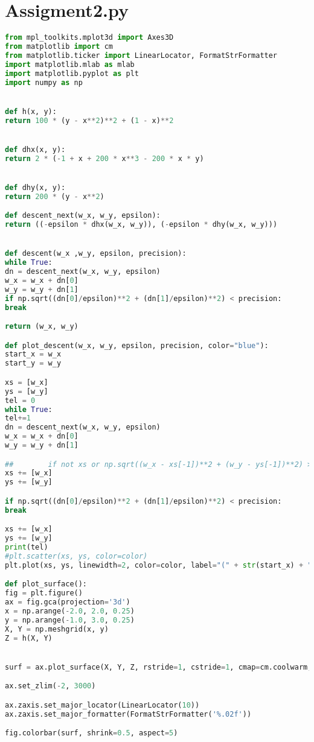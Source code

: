 \documentclass{article}
\begin{document}
\section{Assigment2.py}
\begin{lstlisting}[language=python]
from mpl_toolkits.mplot3d import Axes3D
from matplotlib import cm
from matplotlib.ticker import LinearLocator, FormatStrFormatter
import matplotlib.mlab as mlab
import matplotlib.pyplot as plt
import numpy as np


def h(x, y):
return 100 * (y - x**2)**2 + (1 - x)**2


def dhx(x, y):
return 2 * (-1 + x + 200 * x**3 - 200 * x * y)


def dhy(x, y):
return 200 * (y - x**2)

def descent_next(w_x, w_y, epsilon):
return ((-epsilon * dhx(w_x, w_y)), (-epsilon * dhy(w_x, w_y)))


def descent(w_x ,w_y, epsilon, precision):
while True:
dn = descent_next(w_x, w_y, epsilon)
w_x = w_x + dn[0]
w_y = w_y + dn[1]
if np.sqrt((dn[0]/epsilon)**2 + (dn[1]/epsilon)**2) < precision:
break    

return (w_x, w_y)

def plot_descent(w_x, w_y, epsilon, precision, color="blue"):
start_x = w_x
start_y = w_y

xs = [w_x]
ys = [w_y]
tel = 0
while True:
tel+=1
dn = descent_next(w_x, w_y, epsilon)
w_x = w_x + dn[0]
w_y = w_y + dn[1]

##        if not xs or np.sqrt((w_x - xs[-1])**2 + (w_y - ys[-1])**2) > 0.05:
xs += [w_x]
ys += [w_y]        

if np.sqrt((dn[0]/epsilon)**2 + (dn[1]/epsilon)**2) < precision:
break

xs += [w_x]
ys += [w_y]
print(tel)
#plt.scatter(xs, ys, color=color)
plt.plot(xs, ys, linewidth=2, color=color, label="(" + str(start_x) + "," + str(start_y) + ")")

def plot_surface():
fig = plt.figure()
ax = fig.gca(projection='3d')
x = np.arange(-2.0, 2.0, 0.25)
y = np.arange(-1.0, 3.0, 0.25)
X, Y = np.meshgrid(x, y)
Z = h(X, Y)


surf = ax.plot_surface(X, Y, Z, rstride=1, cstride=1, cmap=cm.coolwarm, linewidth=0, antialiased=False)

ax.set_zlim(-2, 3000)

ax.zaxis.set_major_locator(LinearLocator(10))
ax.zaxis.set_major_formatter(FormatStrFormatter('%.02f'))

fig.colorbar(surf, shrink=0.5, aspect=5)


\end{lstlisting}
\end{document}
